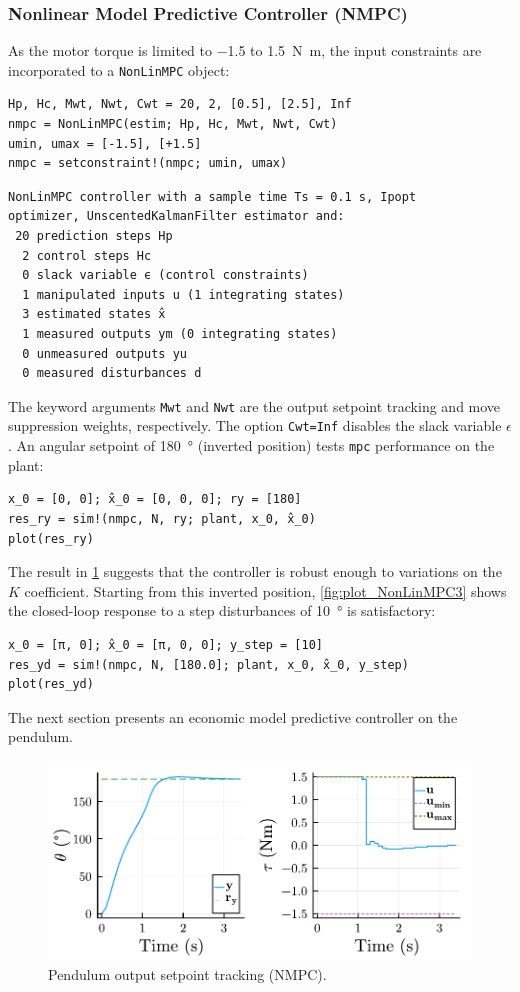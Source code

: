 \subsubsection{Nonlinear Model Predictive Controller (NMPC)}

As the motor torque is limited to \num{-1.5} to \SI{1.5}{\newton\meter}, the input constraints are incorporated to a \texttt{NonLinMPC} object:
\begin{verbatim}
Hp, Hc, Mwt, Nwt, Cwt = 20, 2, [0.5], [2.5], Inf
nmpc = NonLinMPC(estim; Hp, Hc, Mwt, Nwt, Cwt)
umin, umax = [-1.5], [+1.5]
nmpc = setconstraint!(nmpc; umin, umax)
\end{verbatim}
\spacerepl
\begin{verbatim}
NonLinMPC controller with a sample time Ts = 0.1 s, Ipopt
optimizer, UnscentedKalmanFilter estimator and:
 20 prediction steps Hp
  2 control steps Hc
  0 slack variable ϵ (control constraints)
  1 manipulated inputs u (1 integrating states)
  3 estimated states x̂
  1 measured outputs ym (0 integrating states)
  0 unmeasured outputs yu
  0 measured disturbances d
\end{verbatim}
The keyword arguments \texttt{Mwt} and \texttt{Nwt} are the output setpoint tracking and move suppression weights, respectively. The option \texttt{Cwt=Inf} disables the slack variable $\epsilon$. An angular setpoint of \SI{180}{\degree} (inverted position) tests \texttt{mpc} performance on the plant:
\begin{verbatim}
x_0 = [0, 0]; x̂_0 = [0, 0, 0]; ry = [180]
res_ry = sim!(nmpc, N, ry; plant, x_0, x̂_0)
plot(res_ry)
\end{verbatim}
The result in \cref{fig:plot_NonLinMPC2} suggests that the controller is robust enough to variations on the $K$ coefficient. Starting from this inverted position, \cref{fig:plot_NonLinMPC3} shows the closed-loop response to a step disturbances of \SI{10}{\degree} is satisfactory:
\begin{verbatim}
x_0 = [π, 0]; x̂_0 = [π, 0, 0]; y_step = [10]
res_yd = sim!(nmpc, N, [180.0]; plant, x_0, x̂_0, y_step)
plot(res_yd)
\end{verbatim}
The next section presents an economic model predictive controller on the pendulum.

\begin{figure}[ht]
    \centering
    \includegraphics[width=\columnwidth]{fig/plot_NonLinMPC2.pdf}
    \caption{Pendulum output setpoint tracking (NMPC).}\label{fig:plot_NonLinMPC2}
\end{figure}

